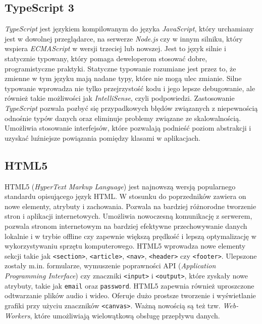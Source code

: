 \subsection{TypeScript 3}
\textit{TypeScript} jest językiem kompilowanym do języka \textit{JavaScript}, który urchamiany jest w dowolnej przeglądarce, na serwerze \textit{Node.js} czy w innym silniku, który wspiera \textit{ECMAScript} w wersji trzeciej lub nowszej. Jest to język silnie i statycznie typowany, który pomaga deweloperom stosować dobre, programistyczne praktyki. Statyczne typowanie rozumiane jest przez to, że zmienne w tym języku mają nadane typy, które nie mogą ulec zmianie. Silne typowanie wprowadza nie tylko przejrzystość kodu i jego lepsze debugowanie, ale również takie możliwości jak \textit{IntelliSense}, czyli podpowiedzi. Zastosowanie \textit{TypeScript} pozwala pozbyć się przypadkowych błędów związanych z niepewnością odnośnie typów danych oraz eliminuje problemy związane ze skalowalnością. Umożliwia stosowanie interfejsów, które pozwalają podnieść poziom abstrakcji i uzyskać luźniejsze powiązania pomiędzy klasami w aplikacjach.

\subsection{HTML5}
HTML5 (\textit{HyperText Markup Language}) jest najnowszą wersją popularnego standardu opisującego język HTML. W stosunku do poprzedników zawiera on nowe elementy, atrybuty i zachowania. Pozwala na bardziej różnorodne tworzenie stron i aplikacji internetowych. Umożliwia nowoczesną komunikację z serwerem, pozwala stronom internetowym na bardziej efektywne przechowywanie danych lokalnie i w trybie offline czy zapewnie większą prędkość i lepszą optymalizację w wykorzystywaniu sprzętu komputerowego. HTML5 wprowadza nowe elementy sekcji takie jak \texttt{<section>}, \texttt{<article>}, \texttt{<nav>}, \texttt{<header>} czy \texttt{<footer>}. Ulepszone zostały m.in. formularze, wymuszenie poprawności API (\textit{Application Programming Interface}) czy znaczniki \texttt{<input>} i \texttt{<output>}, które zyskały nowe atrybuty, takie jak \texttt{email} oraz \texttt{password}. HTML5 zapewnia również uproszczone odtwarzanie plików audio i wideo. Oferuje dużo prostsze tworzenie i wyświetlanie grafiki przy użyciu znaczników \texttt{<canvas>}. Ważną nowością są też tzw. \textit{Web-Workers}, które umożliwiają wielowątkową obsługę przepływu danych.

